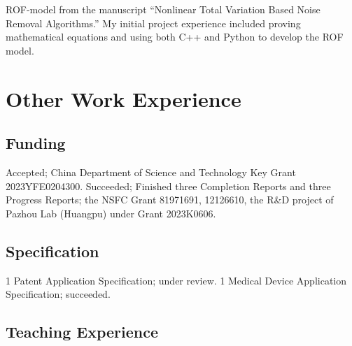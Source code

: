 \documentclass[11pt,a4paper, final]{moderncv}
\newcommand{\spacesection}{\vspace{0.4cm}}
\newcommand{\spacesubsection}{\vspace{0.2cm}}
\begin{document}
	{ROF-model from the manuscript “Nonlinear Total Variation Based Noise Removal Algorithms.”}
	{My initial project experience included proving mathematical equations and using both C++ and Python to develop the ROF model.}
\section{\textbf{Other Work Experience}}
	\subsection{\textbf{Funding}}
		{Accepted; China Department of Science and Technology Key Grant 2023YFE0204300.}
		{Succeeded; Finished three Completion Reports and three Progress Reports; the NSFC Grant 81971691, 12126610, 
		the R\&D project of Pazhou Lab (Huangpu) under Grant 2023K0606.}
	\subsection{\textbf{Specification}}
		{1 Patent Application Specification; under review.}
		{1 Medical Device Application Specification; succeeded.}
	\subsection{\textbf{Teaching Experience}}
\end{document}
